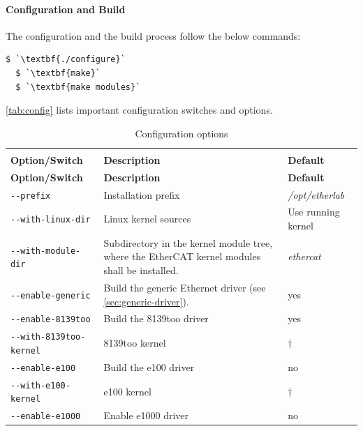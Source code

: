 \documentclass[a4paper,12pt,BCOR=6mm,bibtotoc,idxtotoc]{scrbook}
\begin{document}
\paragraph{Configuration and Build} The configuration and the build process
follow the below commands:

\begin{lstlisting}[gobble=2]
  $ `\textbf{./configure}`
  $ `\textbf{make}`
  $ `\textbf{make modules}`
\end{lstlisting}

\autoref{tab:config} lists important configuration switches and options.

\begin{longtable}{l|p{}|l}
  \caption{Configuration options}\rule[-5ex]{0mm}{0mm}
  \label{tab:config}\\

\textbf{Option/Switch} & \textbf{Description} & \textbf{Default}\\\hline
\endfirsthead

\textbf{Option/Switch} & \textbf{Description} & \textbf{Default}\\\hline
\endhead

\lstinline+--prefix+ & Installation prefix & \textit{/opt/etherlab}\\

\lstinline+--with-linux-dir+ & Linux kernel sources & Use running kernel\\

\lstinline+--with-module-dir+ & Subdirectory in the kernel module tree, where
the EtherCAT kernel modules shall be installed. & \textit{ethercat}\\

\hline

\lstinline+--enable-generic+ & Build the generic Ethernet driver (see
\autoref{sec:generic-driver}). & yes\\

\lstinline+--enable-8139too+ & Build the 8139too driver & yes\\

\lstinline+--with-8139too-kernel+ & 8139too kernel & $\dagger$\\

\lstinline+--enable-e100+ & Build the e100 driver & no\\

\lstinline+--with-e100-kernel+ & e100 kernel & $\dagger$\\

\lstinline+--enable-e1000+ & Enable e1000 driver & no\\


\end{longtable}
\end{document}
